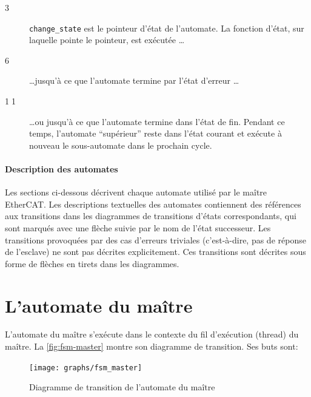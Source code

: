 \documentclass[a4paper,12pt,BCOR=6mm,bibtotoc,idxtotoc]{scrbook}
\newcommand{\linenum}[1]{\normalfont\textcircled{\tiny #1}}
\begin{document}
\begin{description}

\item[\linenum{3}] \lstinline+change_state+ est le pointeur d'\'etat
  de l'automate. La fonction d'\'etat, sur laquelle pointe le
  pointeur, est ex\'ecut\'ee \ldots

\item[\linenum{6}] \ldots jusqu'\`a ce que l'automate termine par
  l'\'etat d'erreur \ldots

\item[\linenum{11}] \ldots ou jusqu'\`a ce que l'automate termine dans
  l'\'etat de fin. Pendant ce temps, l'automate ``sup\'erieur'' reste
  dans l'\'etat courant et ex\'ecute \`a nouveau le sous-automate dans
  le prochain cycle.

\end{description}

\paragraph{Description des automates}

Les sections ci-dessous d\'ecrivent chaque automate utilis\'e par le
ma\^itre EtherCAT.  Les descriptions textuelles des automates contiennent
des r\'ef\'erences aux transitions dans les diagrammes de transitions
d'\'etats correspondants, qui sont marqu\'es avec une fl\`eche suivie par le
nom de l'\'etat successeur.  Les transitions provoqu\'ees par des cas
d'erreurs triviales (c'est-\`a-dire, pas de r\'eponse de l'esclave) ne
sont pas d\'ecrites explicitement. Ces transitions sont d\'ecrites sous
forme de fl\`eches en tirets dans les diagrammes.

\section{L'automate du ma\^itre}
\label{sec:fsm-master}

L'automate du ma\^itre s'ex\'ecute dans le contexte du fil d'ex\'ecution
(thread) du ma\^itre. La \autoref{fig:fsm-master} montre son diagramme de
transition. Ses buts sont:

\begin{figure}[htbp]
  \centering
  \texttt{[image: graphs/fsm\_master]}
  \caption{Diagramme de transition de l'automate du ma\^itre}
  \label{fig:fsm-master}
\end{figure}
\end{document}
